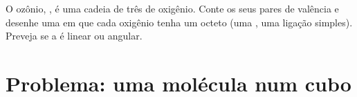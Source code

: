 \begin{exercise}[$\star\star\star$]\label{exo:g10:lewis-and-shape:15}
O ozônio, , é uma cadeia de três  de oxigênio. Conte os
seus pares de valência e desenhe uma  em que cada
oxigênio tenha um octeto (uma , uma ligação simples).
Preveja se a  é linear ou angular.
\end{exercise}

\section{Problema: uma molécula num cubo}

